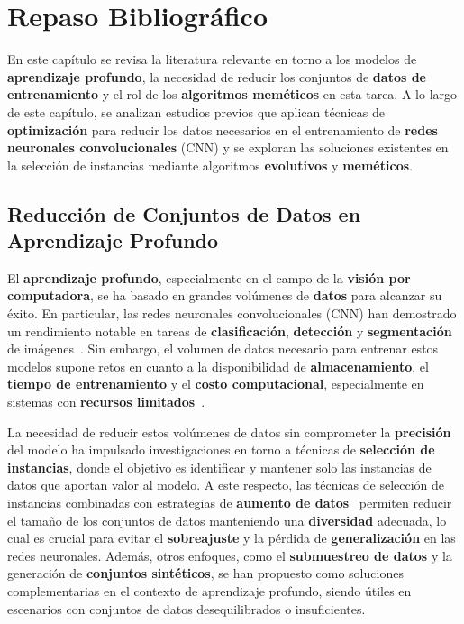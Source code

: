 \chapter{Repaso Bibliográfico}\label{ch:repaso-bibliografico}
En este capítulo se revisa la literatura relevante en torno a los modelos de \textbf{aprendizaje profundo}, la
necesidad de reducir los conjuntos de \textbf{datos de entrenamiento} y el rol de los \textbf{algoritmos meméticos} en
esta tarea.
A lo largo de este capítulo, se analizan estudios previos que aplican técnicas de \textbf{optimización} para reducir
los datos necesarios en el entrenamiento de \textbf{redes neuronales convolucionales} (CNN) y se exploran las
soluciones existentes en la selección de instancias mediante algoritmos \textbf{evolutivos} y \textbf{meméticos}.


\section{Reducción de Conjuntos de Datos en Aprendizaje Profundo}
\label{sec:reduccion-de-conjuntos-de-datos-en-aprendizaje-profundo}
El \textbf{aprendizaje profundo}, especialmente en el campo de la \textbf{visión por computadora}, se ha basado en
grandes volúmenes de \textbf{datos} para alcanzar su éxito.
En particular, las redes neuronales convolucionales (CNN) han demostrado un rendimiento notable en tareas de
\textbf{clasificación}, \textbf{detección} y \textbf{segmentación} de imágenes~\cite{goodfellow_deep_2016}.
Sin embargo, el volumen de datos necesario para entrenar estos modelos supone retos en cuanto a la disponibilidad de
\textbf{almacenamiento}, el \textbf{tiempo de entrenamiento} y el \textbf{costo computacional}, especialmente en
sistemas con \textbf{recursos limitados}~\cite{lecun_deep_2015}.


La necesidad de reducir estos volúmenes de datos sin comprometer la \textbf{precisión} del modelo ha impulsado
investigaciones en torno a técnicas de \textbf{selección de instancias}, donde el objetivo es identificar y mantener
solo las instancias de datos que aportan valor al modelo.
A este respecto, las técnicas de selección de instancias combinadas con estrategias de
\textbf{aumento de datos}~\cite{shorten_survey_2019} permiten reducir el tamaño de los conjuntos de datos
manteniendo una \textbf{diversidad} adecuada, lo cual es crucial para evitar el \textbf{sobreajuste} y la pérdida de
\textbf{generalización} en las redes neuronales.
Además, otros enfoques, como el \textbf{submuestreo de datos} y la generación de \textbf{conjuntos sintéticos}, se han
propuesto como soluciones complementarias en el contexto de aprendizaje profundo, siendo útiles en escenarios con
conjuntos de datos desequilibrados o insuficientes.


